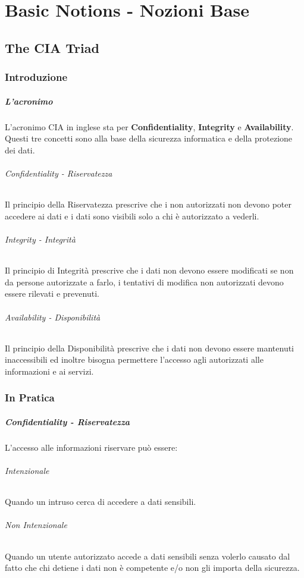 \chapter{Basic Notions - Nozioni Base}
\thispagestyle{chapterInit}
\section{The CIA Triad}
\label{sec:ciaTriad}
    \subsection{Introduzione}
    \paragraph{L'acronimo} L'acronimo CIA in inglese sta per \textbf{Confidentiality}, \textbf{Integrity} e \textbf{Availability}. Questi tre concetti sono alla base della sicurezza informatica e della protezione dei dati.  
        \subparagraph{Confidentiality - Riservatezza}
        \label{subPar:confidentiality}
            Il principio della Riservatezza prescrive che i non autorizzati non devono poter accedere ai dati e i dati sono visibili solo a chi è autorizzato a vederli.
        \subparagraph{Integrity - Integrità}
        \label{subPar:integrity}
            Il principio di Integrità prescrive che i dati non devono essere modificati se non da persone autorizzate a farlo, i tentativi di modifica non autorizzati devono essere rilevati e prevenuti.
        \subparagraph{Availability - Disponibilità}
            Il principio della Disponibilità prescrive che i dati non devono essere mantenuti inaccessibili ed inoltre bisogna permettere l'accesso agli autorizzati alle informazioni e ai servizi.
    \subsection{In Pratica}
        \paragraph{Confidentiality - Riservatezza}
            L'accesso alle informazioni riservare può essere:
            \subparagraph{Intenzionale} Quando un intruso cerca di accedere a dati sensibili.
            \subparagraph{Non Intenzionale} Quando un utente autorizzato accede a dati sensibili senza volerlo causato dal fatto che chi detiene i dati non è competente e/o non gli importa della sicurezza.
        
